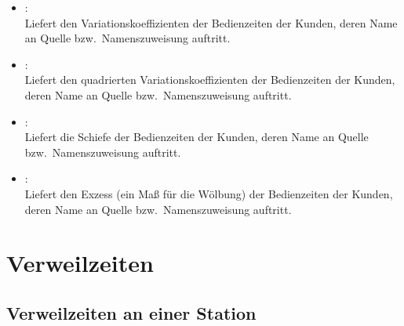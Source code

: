 \begin{itemize}
\item
{}:\\
Liefert den Variationskoeffizienten der Bedienzeiten der Kunden, deren Name an Quelle bzw.\ Namenszuweisung  auftritt.

\item
{}:\\
Liefert den quadrierten Variationskoeffizienten der Bedienzeiten der Kunden, deren Name an Quelle bzw.\ Namenszuweisung  auftritt.

\item
{}:\\
Liefert die Schiefe der Bedienzeiten der Kunden, deren Name an Quelle bzw.\ Namenszuweisung  auftritt.

\item
{}:\\
Liefert den Exzess (ein Maß für die Wölbung) der Bedienzeiten der Kunden, deren Name an Quelle bzw.\ Namenszuweisung  auftritt.

\end{itemize}



\section{Verweilzeiten}



\subsection{Verweilzeiten an einer Station}

